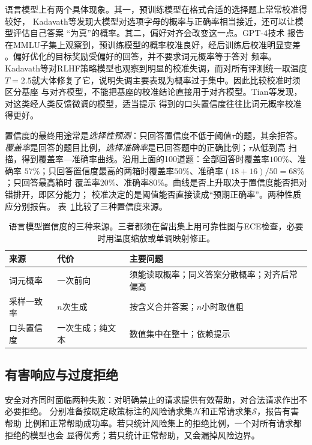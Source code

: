 语言模型上有两个具体现象。其一，预训练模型在格式合适的选择题上常常校准得较好，
Kadavath等发现大模型对选项字母的概率与正确率相当接近，还可以让模型评估自己答案
“为真”的概率。其二，偏好对齐会改变这一点。GPT-4技术
报告在MMLU子集上观察到，预训练模型的概率校准良好，经后训练后校准明显变差
。偏好优化的目标奖励受偏好的回答，并不要求词元概率等于答对
频率。Kadavath等对RLHF策略模型也观察到明显的校准失调，而对所有评测统一取温度
$T=2.5$就大体修复了它，说明失调主要表现为概率过于集中。因此比较校准时须区分基座
与对齐模型，不能把基座的校准结论直接用于对齐模型。Tian等发现，对这类经人类反馈微调的模型，适当提示
得到的口头置信度往往比词元概率校准得更好。

置信度的最终用途常是\emph{选择性预测}：只回答置信度不低于阈值$\tau$的题，其余拒答。
\emph{覆盖率}是回答的题目比例，\emph{选择准确率}是已回答题中的正确比例；$\tau$从低到高
扫描，得到覆盖率—准确率曲线。沿用上面的100道题：全部回答时覆盖率$100\%$、准确率
$57\%$；只回答置信度最高的两箱时覆盖率$50\%$、准确率$(18+16)/50=68\%$；只回答最高箱时
覆盖率$20\%$、准确率$80\%$。曲线是否上升取决于置信度能否把对错排开，即区分能力；
校准决定的是阈值能否直接读成“预期正确率”。两种性质应分别报告。
表~\ref{tab:nlp-eval-confidence-sources}比较了三种置信度来源。

\begin{table}[htbp]
 \begin{tabularx}{\linewidth}{@{}p{20mm}p{28mm}X@{}}
  \toprule
  来源 & 代价 & 主要问题\\
  \midrule
  词元概率 & 一次前向 & 须能读取概率；同义答案分散概率；对齐后常偏高\\
  采样一致率 & $n$次生成 & 按含义合并答案；$n$小时取值粗\\
  口头置信度 & 一次生成；纯文本 & 数值集中在整十；依赖提示\\
  \bottomrule
 \end{tabularx}
 \caption{语言模型置信度的三种来源。三者都须在留出集上用可靠性图与ECE检查，必要时用温度缩放或单调映射修正。}
 \label{tab:nlp-eval-confidence-sources}
\end{table}

\subsection{有害响应与过度拒绝}
\label{sec:nlp-eval-refusal}

安全对齐同时面临两种失败：对明确禁止的请求提供有效帮助，对合法请求作出不必要拒绝。
分别准备按既定政策标注的风险请求集$\mathcal H$和正常请求集$\mathcal S$，报告有害帮助
比例和正常帮助成功率。若只统计风险集上的拒绝比例，一个对所有请求都拒绝的模型也会
显得优秀；若只统计正常帮助，又会漏掉风险边界。

